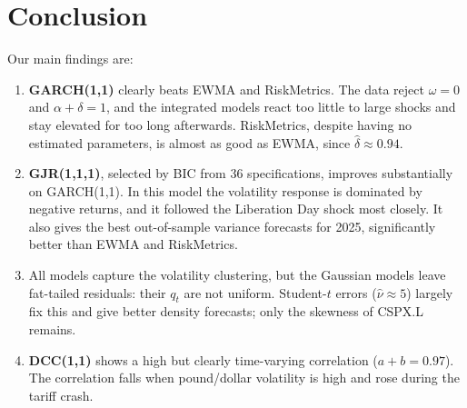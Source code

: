 \documentclass[10pt,a4paper]{article}
\begin{document}
\section{Conclusion}\label{sec:conclusion}
Our main findings are:
\begin{enumerate}
    \item \textbf{GARCH(1,1)} clearly beats EWMA and RiskMetrics. The data reject $\omega=0$ and
    $\alpha+\delta=1$, and the integrated models react too little to large shocks and stay elevated for
    too long afterwards. RiskMetrics, despite having no estimated parameters, is almost as good as EWMA,
    since $\hat\delta\approx0.94$.
    \item \textbf{GJR(1,1,1)}, selected by BIC from 36 specifications, improves substantially on
    GARCH(1,1). In this model the volatility response is dominated by negative returns, and it followed the
    Liberation Day shock most closely. It also gives the best out-of-sample variance forecasts for 2025,
    significantly better than EWMA and RiskMetrics.
    \item All models capture the volatility clustering, but the Gaussian models leave fat-tailed residuals:
    their $q_t$ are not uniform. Student-$t$ errors ($\hat\nu\approx5$) largely fix this and give
    better density forecasts; only the skewness of CSPX.L remains.
    \item \textbf{DCC(1,1)} shows a high but clearly time-varying correlation ($a+b=0.97$). The
    correlation falls when pound/dollar volatility is high and rose during the tariff crash.
\end{enumerate}

\end{document}
